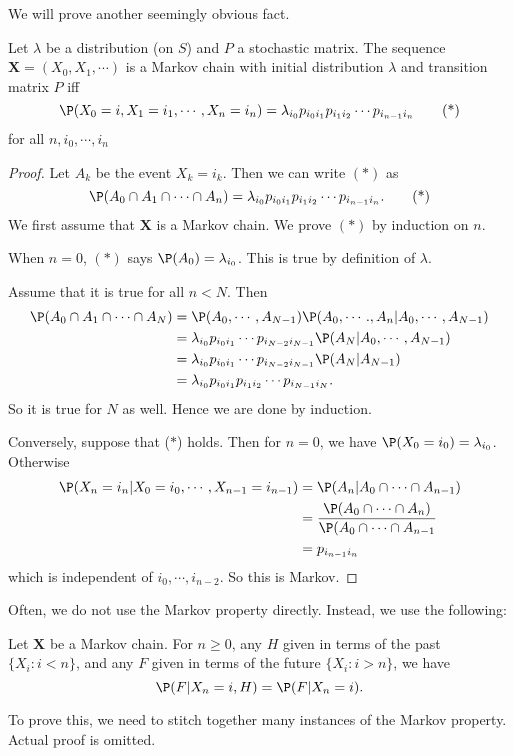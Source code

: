 \documentclass[a4paper]{article}
\begin{document}
We will prove another seemingly obvious fact.
\begin{thm}
  Let $\lambda$ be a distribution (on $S$) and $P$ a stochastic matrix. The sequence $\mathbf{X} = (X_0, X_1, \cdots)$ is a Markov chain with initial distribution $\lambda$ and transition matrix $P$ iff
  \[
    \P(X_0 = i, X_1 = i_1, \cdots, X_n = i_n) = \lambda_{i_0}p_{i_0 i_1}p_{i_1i_2}\cdots p_{i_{n - 1}i_n}\tag{*}
  \]
  for all $n, i_0, \cdots, i_n$
\end{thm}
\begin{proof}
  Let $A_k$ be the event $X_k = i_k$. Then we can write $(*)$ as
  \[
    \P(A_0\cap A_1\cap\cdots \cap A_n) = \lambda_{i_0}p_{i_0 i_1}p_{i_1i_2}\cdots p_{i_{n - 1}i_n}. \tag{*}
  \]
  We first assume that $\mathbf{X}$ is a Markov chain. We prove $(*)$ by induction on $n$.

  When $n = 0$, $(*)$ says $\P(A_0) = \lambda_{i_0}$. This is true by definition of $\lambda$.

  Assume that it is true for all $n < N$. Then
  \begin{align*}
    \P(A_0 \cap A_1 \cap \cdots \cap A_N) &= \P(A_0,\cdots, A_{N - 1})\P(A_0, \cdots., A_n | A_0, \cdots, A_{N - 1})\\
    &= \lambda_{i_0} p_{i_0 i_1}\cdots p_{i_{N - 2}i_{N - 1}} \P(A_{N} | A_0,\cdots, A_{N - 1})\\
    &= \lambda_{i_0} p_{i_0 i_1}\cdots p_{i_{N - 2}i_{N - 1}} \P(A_{N} | A_{N - 1})\\
    &= \lambda_{i_0}p_{i_0 i_1}p_{i_1i_2}\cdots p_{i_{N - 1}i_N}.
  \end{align*}
  So it is true for $N$ as well. Hence we are done by induction.

  Conversely, suppose that ($*$) holds. Then for $n = 0$, we have $\P(X_0 = i_0) = \lambda_{i_0}$. Otherwise
  \begin{align*}
    \P(X_n = i_n| X_0 = i_0, \cdots, X_{n - 1} = i_{n - 1}) &= \P(A_n | A_0 \cap \cdots\cap A_{n - 1})\\
    &= \frac{\P(A_0\cap \cdots \cap A_n)}{\P(A_0\cap \cdots \cap A_{n - 1}}\\
    &= p_{i_{n - 1}i_n}
  \end{align*}
  which is independent of $i_0, \cdots, i_{n - 2}$. So this is Markov.
\end{proof}

Often, we do not use the Markov property directly. Instead, we use the following:
\begin{thm}
  Let $\mathbf{X}$ be a Markov chain. For $n \geq 0$, any $H$ given in terms of the past $\{X_i: i < n\}$, and any $F$ given in terms of the future $\{X_i: i > n\}$, we have
  \[
    \P(F| X_n = i, H) = \P(F| X_n = i).
  \]
\end{thm}
To prove this, we need to stitch together many instances of the Markov property. Actual proof is omitted.
\end{document}
